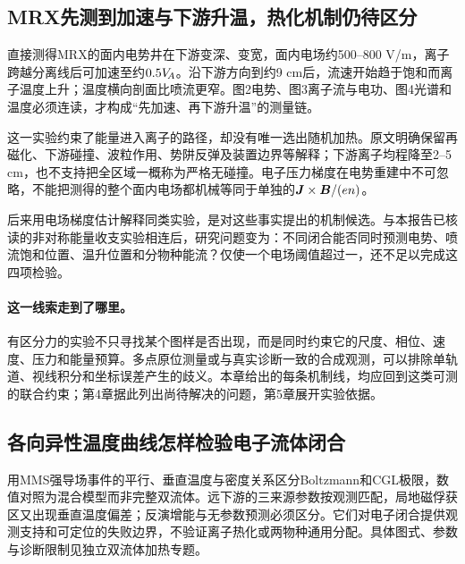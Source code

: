\subsection{MRX先测到加速与下游升温，热化机制仍待区分}\label{sec:synthesis-mrx}
\citet{Yoo2013}直接测得MRX的面内电势井在下游变深、变宽，面内电场约500--800 V/m，离子跨越分离线后可加速至约$0.5V_{\!A}$。沿下游方向到约9 cm后，流速开始趋于饱和而离子温度上升；温度横向剖面比喷流更窄。图2电势、图3离子流与电功、图4光谱和温度必须连读，才构成“先加速、再下游升温”的测量链。

这一实验约束了能量进入离子的路径，却没有唯一选出随机加热。原文明确保留再磁化、下游碰撞、波粒作用、势阱反弹及装置边界等解释；下游离子均程降至2--5 cm，也不支持把全区域一概称为严格无碰撞。电子压力梯度在电势重建中不可忽略，不能把测得的整个面内电场都机械等同于单独的$\bm{J}\times\bm{B}/(en)$。

\citet{L272}后来用电场梯度估计解释同类实验，是对这些事实提出的机制候选。与本报告已核读的非对称能量收支实验\citep{Yamada2018}相连后，研究问题变为：不同闭合能否同时预测电势、喷流饱和位置、温升位置和分物种能流？仅使一个电场阈值超过一，还不足以完成这四项检验。

\paragraph{这一线索走到了哪里。}有区分力的实验不只寻找某个图样是否出现，而是同时约束它的尺度、相位、速度、压力和能量预算。多点原位测量或与真实诊断一致的合成观测，可以排除单轨道、视线积分和坐标误差产生的歧义。本章给出的每条机制线，均应回到这类可测的联合约束；第4章据此列出尚待解决的问题，第5章展开实验依据。


\subsection{各向异性温度曲线怎样检验电子流体闭合}
\citet{Wetherton2019}用MMS强导场事件的平行、垂直温度与密度关系区分Boltzmann和CGL极限，数值对照为混合模型而非完整双流体。\citet{Wetherton2021}远下游的三来源参数按观测匹配，局地磁俘获区又出现垂直温度偏差；反演增能与无参数预测必须区分。它们对电子闭合提供观测支持和可定位的失败边界，不验证离子热化或两物种通用分配。具体图式、参数与诊断限制见独立双流体加热专题。
